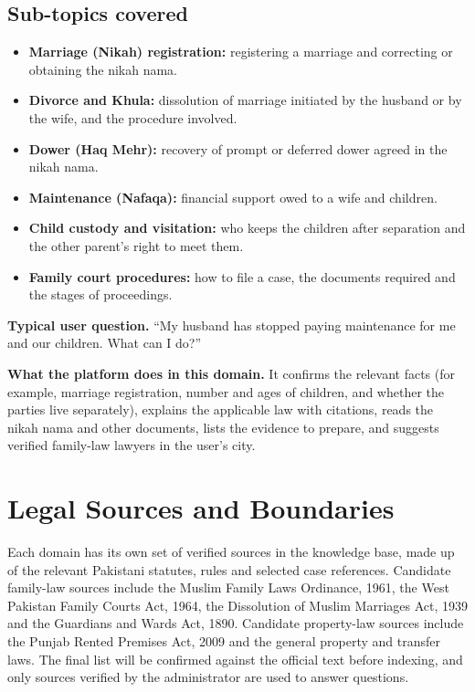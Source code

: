 \documentclass[11pt,a4paper]{article}
\begin{document}
\subsection*{Sub-topics covered}
\begin{itemize}
  \item \textbf{Marriage (Nikah) registration:} registering a marriage and correcting or obtaining the nikah nama.
  \item \textbf{Divorce and Khula:} dissolution of marriage initiated by the husband or by the wife, and the procedure involved.
  \item \textbf{Dower (Haq Mehr):} recovery of prompt or deferred dower agreed in the nikah nama.
  \item \textbf{Maintenance (Nafaqa):} financial support owed to a wife and children.
  \item \textbf{Child custody and visitation:} who keeps the children after separation and the other parent's right to meet them.
  \item \textbf{Family court procedures:} how to file a case, the documents required and the stages of proceedings.
\end{itemize}
\textbf{Typical user question.} ``My husband has stopped paying maintenance for me and our children. What can I do?''

\textbf{What the platform does in this domain.} It confirms the relevant facts (for example, marriage registration, number and ages of children, and whether the parties live separately), explains the applicable law with citations, reads the nikah nama and other documents, lists the evidence to prepare, and suggests verified family-law lawyers in the user's city.

\section{Legal Sources and Boundaries}
Each domain has its own set of verified sources in the knowledge base, made up of the relevant Pakistani statutes, rules and selected case references. Candidate family-law sources include the Muslim Family Laws Ordinance, 1961, the West Pakistan Family Courts Act, 1964, the Dissolution of Muslim Marriages Act, 1939 and the Guardians and Wards Act, 1890. Candidate property-law sources include the Punjab Rented Premises Act, 2009 and the general property and transfer laws. The final list will be confirmed against the official text before indexing, and only sources verified by the administrator are used to answer questions.
\end{document}
